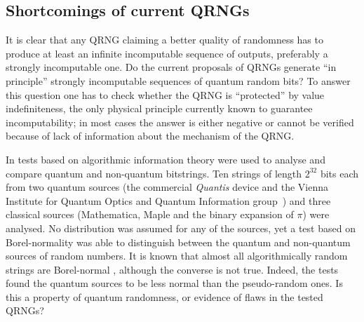 \documentclass{mscs}
\begin{document}
\subsection{Shortcomings of current QRNGs}

It is clear that any QRNG claiming a better quality of randomness has to produce at least an infinite incomputable sequence of outputs, preferably  a strongly incomputable one.
Do the current proposals of QRNGs generate ``in principle'' strongly incomputable sequences of quantum random bits?
To answer this question one has to check whether the QRNG is ``protected'' by value indefiniteness, the only physical principle currently known to guarantee incomputability; in most cases the answer is either negative or cannot be verified because of lack of information about the mechanism of the QRNG.

In \citet{PhysRevA.82.022102} tests based on algorithmic information theory were used to analyse and compare quantum and non-quantum bitstrings.
Ten strings of length $2^{32}$ bits each from two quantum sources (the commercial {\em Quantis} device \citep{Quantis} and the Vienna Institute for Quantum Optics and Quantum Information group~\citep{ThomasJennewein}) and three classical sources (Mathematica, Maple and the binary expansion of $\pi$) were analysed.
No distribution was assumed for any of the sources, yet a test based on Borel-normality was able to distinguish between the quantum and non-quantum sources of random numbers. It is known that almost all algorithmically random strings are Borel-normal \citep{calude:02}, although the converse is not true. Indeed, the tests found the quantum sources to be less normal than the pseudo-random  ones. Is this a property of quantum randomness, or evidence of flaws in the tested QRNGs?
\end{document}
